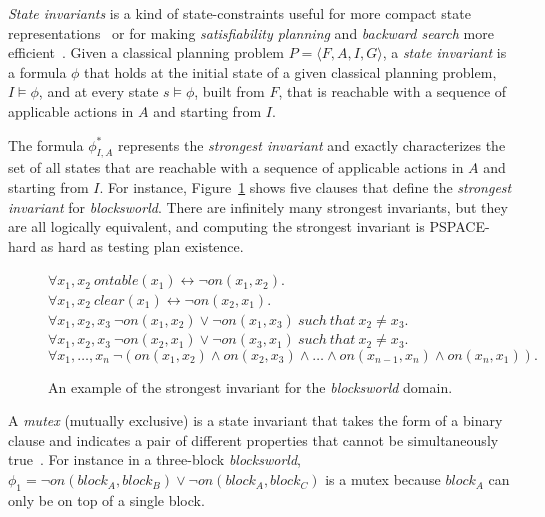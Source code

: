 \documentclass[3p,times]{elsarticle}
\newcommand{\tup}[1]{{\langle #1 \rangle}}
\begin{document}
{\em State invariants} is a kind of state-constraints useful for more compact state representations~\cite{helmert2009concise} or for making {\em satisfiability planning} and {\em backward search} more efficient~\cite{rintanen2014madagascar,alcazar2015reminder}. Given a classical planning problem $P=\tup{F,A,I,G}$, a {\em state invariant} is a formula $\phi$ that holds at the initial state of a given classical planning problem, $I\models \phi$, and at every state $s\models \phi$, built from $F$, that is reachable with a sequence of applicable actions in $A$ and starting from $I$.

The formula $\phi_{I,A}^*$ represents the {\em strongest invariant} and exactly characterizes the set of all states that are reachable with a sequence of applicable actions in $A$ and starting from $I$. For instance, Figure~\ref{fig:strongest-invariant} shows five clauses that define the {\em strongest invariant} for {\em blocksworld}. There are infinitely many strongest invariants, but they are all logically equivalent, and computing the strongest invariant is PSPACE-hard as hard as testing plan existence.

\begin{figure}[hbt!]
  \begin{footnotesize}
    \begin{center}
$\forall x_1,x_2\ ontable(x_1)\leftrightarrow\neg on(x_1,x_2)$.\\
$\forall x_1,x_2\ clear(x_1)\leftrightarrow\neg on(x_2,x_1)$.\\
$\forall x_1,x_2,x_3\ \neg on(x_1,x_2)\vee\neg on(x_1,x_3)\ such\ that\ x_2\neq x_3$.\\
$\forall x_1,x_2,x_3\ \neg on(x_2,x_1)\vee\neg on(x_3,x_1)\ such\ that\ x_2\neq x_3$.\\
$\forall x_1,\ldots,x_n\ \neg(on(x_1,x_2)\wedge on(x_2,x_3)\wedge\ldots\wedge on(x_{n-1},x_n)\wedge on(x_n,x_1)).$
    \end{center}
\end{footnotesize}
 \caption{\small An example of the strongest invariant for the {\em blocksworld} domain.}
\label{fig:strongest-invariant}
\end{figure}


A {\em mutex} (mutually exclusive) is a state invariant that takes the form of a binary clause and indicates a pair of different properties that cannot be simultaneously true~\cite{kautz:mutex:IJCAI1999}. For instance in a three-block {\em blocksworld}, $\phi_1=\neg on(block_A,block_B)\vee \neg on(block_A,block_C)$ is a mutex because $block_A$ can only be on top of a single block.
\end{document}
